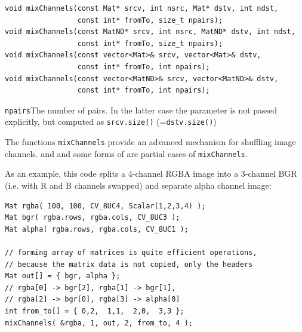 \begin{lstlisting}
void mixChannels(const Mat* srcv, int nsrc, Mat* dstv, int ndst,
                 const int* fromTo, size_t npairs);
void mixChannels(const MatND* srcv, int nsrc, MatND* dstv, int ndst,
                 const int* fromTo, size_t npairs);
void mixChannels(const vector<Mat>& srcv, vector<Mat>& dstv,
                 const int* fromTo, int npairs);
void mixChannels(const vector<MatND>& srcv, vector<MatND>& dstv,
                 const int* fromTo, int npairs);
\end{lstlisting}
\begin{description}
\texttt{npairs}{The number of pairs. In the latter case the parameter is not passed explicitly, but computed as \texttt{srcv.size()} (=\texttt{dstv.size()})}
\end{description}

The functions \texttt{mixChannels} provide an advanced mechanism for shuffling image channels.  and  and some forms of  are partial cases of \texttt{mixChannels}.

As an example, this code splits a 4-channel RGBA image into a 3-channel
BGR (i.e. with R and B channels swapped) and separate alpha channel image:

\begin{lstlisting}
Mat rgba( 100, 100, CV_8UC4, Scalar(1,2,3,4) );
Mat bgr( rgba.rows, rgba.cols, CV_8UC3 );
Mat alpha( rgba.rows, rgba.cols, CV_8UC1 );

// forming array of matrices is quite efficient operations,
// because the matrix data is not copied, only the headers
Mat out[] = { bgr, alpha };
// rgba[0] -> bgr[2], rgba[1] -> bgr[1],
// rgba[2] -> bgr[0], rgba[3] -> alpha[0]
int from_to[] = { 0,2,  1,1,  2,0,  3,3 };
mixChannels( &rgba, 1, out, 2, from_to, 4 );
\end{lstlisting}

